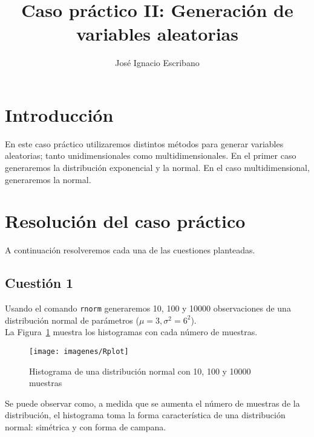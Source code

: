 \documentclass[12pt,a4paper,twoside,openright,titlepage,final]{article}
\author{José Ignacio Escribano}
\title{Caso práctico II: Generación de variables aleatorias}
\begin{document}
\setcounter{page}{1}


\listoftables
\thispagestyle{empty}
\newpage

\listoffigures
\thispagestyle{empty}
\newpage

\tableofcontents
\thispagestyle{empty}
\newpage


\setcounter{page}{1}

\section{Introducción}

En este caso práctico utilizaremos distintos métodos para generar variables aleatorias; tanto unidimensionales como multidimensionales. En el primer caso generaremos la distribución exponencial y la normal. En el caso multidimensional, generaremos la normal.

\section{Resolución del caso práctico}

A continuación resolveremos cada una de las cuestiones planteadas.

\subsection{Cuestión 1}\label{cuestion:1}

Usando el comando \texttt{rnorm} generaremos 10, 100 y 10000 observaciones de una distribución normal de parámetros ($\mu = 3, \sigma^2 = 6^2$).\\

La Figura~\ref{fig:Rplot} muestra los histogramas con cada número de muestras.\\

\begin{figure}[htbp!]
\centering
\texttt{[image: imagenes/Rplot]}
\caption{Histograma de una distribución normal con 10, 100 y 10000 muestras}
\label{fig:Rplot}
\end{figure}

Se puede observar como, a medida que se aumenta el número de muestras de la distribución, el histograma toma la forma característica de una distribución normal: simétrica y con forma de campana.\\
\end{document}
